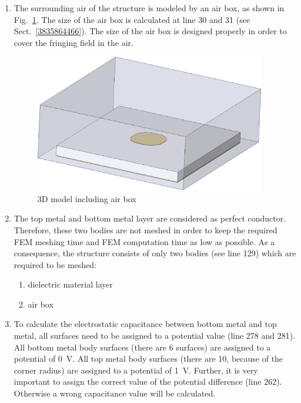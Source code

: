 \documentclass[10pt,a4paper,titlepage]{article}
\newcommand{\fig}[1]{Fig.~\ref{#1}}
\newcommand{\sect}[1]{Sect.~\ref{#1}}
\begin{document}
	\begin{enumerate}
		\item The surrounding air of the structure is modeled by an air box, as shown in \fig{3835947430}. The size of the air box is calculated at line 30 and 31 (see \sect{3835864466}). The size of the air box is designed properly in order to cover the fringing field in the air.
		
		\begin{figure}[H]
			\begin{center}
				\includegraphics[width=!, height=6cm, angle=0]{./fig/example_01.JPG}
				\caption{3D model including air box}
				\label{3835947430}
			\end{center}
		\end{figure}
		
		\item The top metal and bottom metal layer are considered as perfect conductor. Therefore, these two bodies are not meshed in order to keep the required FEM meshing time and FEM computation time as low as possible. As a consequence, the structure consists of only two bodies (see line 129) which are required to be meshed:
		\begin{enumerate}
			\item dielectric material layer
			\item air box
		\end{enumerate}
		
		\item To calculate the electrostatic capacitance between bottom metal and top metal, all surfaces need to be assigned to a potential value (line 278 and 281). All bottom metal body surfaces (there are 6 surfaces) are assigned to a potential of \SI{0}{\volt}. All top metal body surfaces (there are 10, because of the corner radius) are assigned to a potential of \SI{1}{\volt}. Further, it is very important to assign the correct value of the potential difference (line 262). Otherwise a wrong capacitance value will be calculated.
		

\end{enumerate}
\end{document}
